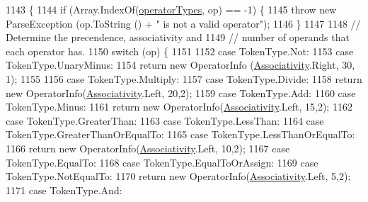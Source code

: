 \begin{DoxyCode}
1143                                                                        \{
1144                 \textcolor{keywordflow}{if} (Array.IndexOf(\hyperlink{a00058_a8dca7db3b76b8c358aba6068274e07df}{operatorTypes}, op) == -1) \{
1145                     \textcolor{keywordflow}{throw} \textcolor{keyword}{new} ParseException (op.ToString () + \textcolor{stringliteral}{" is not a valid operator"});
1146                 \}
1147 
1148                 \textcolor{comment}{// Determine the precendence, associativity and}
1149                 \textcolor{comment}{// number of operands that each operator has.}
1150                 \textcolor{keywordflow}{switch} (op) \{
1151 
1152                 \textcolor{keywordflow}{case} TokenType.Not:
1153                 \textcolor{keywordflow}{case} TokenType.UnaryMinus:
1154                     \textcolor{keywordflow}{return} \textcolor{keyword}{new} OperatorInfo (\hyperlink{a00058_a83fa1b8db0e6678006920812b6f33f62}{Associativity}.Right, 30, 1);
1155 
1156                 \textcolor{keywordflow}{case} TokenType.Multiply:
1157                 \textcolor{keywordflow}{case} TokenType.Divide:
1158                     \textcolor{keywordflow}{return} \textcolor{keyword}{new} OperatorInfo(\hyperlink{a00058_a83fa1b8db0e6678006920812b6f33f62}{Associativity}.Left, 20,2);
1159                 \textcolor{keywordflow}{case} TokenType.Add:
1160                 \textcolor{keywordflow}{case} TokenType.Minus:
1161                     \textcolor{keywordflow}{return} \textcolor{keyword}{new} OperatorInfo(\hyperlink{a00058_a83fa1b8db0e6678006920812b6f33f62}{Associativity}.Left, 15,2);
1162                 \textcolor{keywordflow}{case} TokenType.GreaterThan:
1163                 \textcolor{keywordflow}{case} TokenType.LessThan:
1164                 \textcolor{keywordflow}{case} TokenType.GreaterThanOrEqualTo:
1165                 \textcolor{keywordflow}{case} TokenType.LessThanOrEqualTo:
1166                     \textcolor{keywordflow}{return} \textcolor{keyword}{new} OperatorInfo(\hyperlink{a00058_a83fa1b8db0e6678006920812b6f33f62}{Associativity}.Left, 10,2);
1167                 \textcolor{keywordflow}{case} TokenType.EqualTo:
1168                 \textcolor{keywordflow}{case} TokenType.EqualToOrAssign:
1169                 \textcolor{keywordflow}{case} TokenType.NotEqualTo:
1170                     \textcolor{keywordflow}{return} \textcolor{keyword}{new} OperatorInfo(\hyperlink{a00058_a83fa1b8db0e6678006920812b6f33f62}{Associativity}.Left, 5,2);
1171                 \textcolor{keywordflow}{case} TokenType.And:

\end{DoxyCode}
